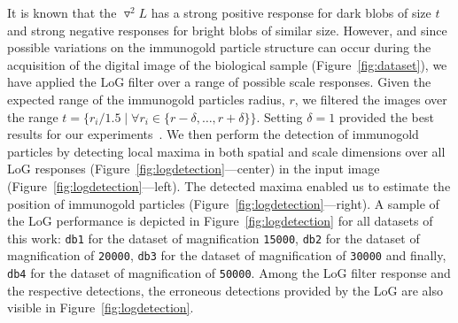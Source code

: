 \documentclass[a4paper,11pt]{article}
\newcommand{\1}{\mathbbm{1}}
\newcommand{\fref}[1]{Figure~\ref{#1}}
\newcommand{\db}[1]{\texttt{#1}}
\theoremstyle{plain}
\begin{document}
It is known that the $\triangledown^2 L$ has a strong positive response for dark blobs of size $t$ and strong negative responses for bright blobs of similar size. However, and since possible variations on the immunogold particle structure can occur during the acquisition of the digital image of the biological sample (\fref{fig:dataset}), we have applied the \ac{LoG} filter over a range of possible scale responses. Given the expected range of the immunogold particles radius, $r$, we filtered the images over the range $t = \{r_i/1.5 \mid \forall r_i \in \{r-\delta,\ldots,r+\delta\} \}$. Setting $\delta = 1$ provided the best results for our experiments~\cite{RGamelasSousaICIAR2015}. We then perform the detection of immunogold particles by detecting local maxima in both spatial and scale dimensions over all \ac{LoG} responses (\fref{fig:logdetection}---center) in the input image (\fref{fig:logdetection}---left). The detected maxima enabled us to estimate the position of immunogold particles (\fref{fig:logdetection}---right).
A sample of the \ac{LoG} performance is depicted in \fref{fig:logdetection} for all datasets of this work: \db{db1} for the dataset of magnification \db{15000}, \db{db2} for the dataset of magnification of \db{20000}, \db{db3} for the dataset of magnification of \db{30000} and finally, \db{db4} for the dataset of magnification of \db{50000}.
Among the \ac{LoG} filter response and the respective detections, the erroneous detections provided by the \ac{LoG} are also visible in \fref{fig:logdetection}.
\end{document}
